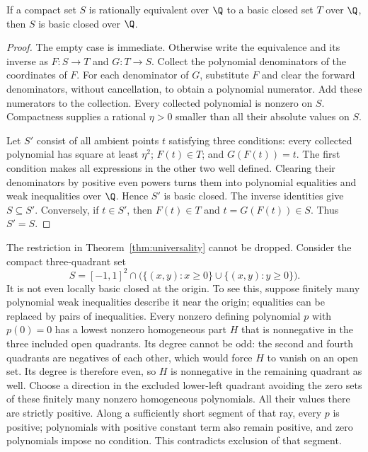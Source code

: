 \begin{proposition}
\label{prop:basic-invariance}
If a compact set $S$ is rationally equivalent over $\Q$ to a basic closed
set $T$ over $\Q$, then $S$ is basic closed over $\Q$.
\end{proposition}
\begin{proof}
The empty case is immediate. Otherwise write the equivalence and its
inverse as $F:S\to T$ and $G:T\to S$. Collect the polynomial denominators
of the coordinates of $F$. For each denominator of $G$, substitute $F$
and clear the forward denominators, without cancellation, to obtain a
polynomial numerator. Add these numerators to the collection. Every
collected polynomial is nonzero on $S$. Compactness supplies a rational
$\eta>0$ smaller than all their absolute values on $S$.

Let $S'$ consist of all ambient points $t$ satisfying three conditions:
every collected polynomial has square at least $\eta^2$;
$F(t)\in T$; and $G(F(t))=t$. The first condition makes all expressions
in the other two well defined. Clearing their denominators by positive
even powers turns them into polynomial equalities and weak inequalities
over $\Q$. Hence $S'$ is basic closed. The inverse identities give
$S\subseteq S'$. Conversely, if $t\in S'$, then $F(t)\in T$ and
$t=G(F(t))\in S$. Thus $S'=S$.
\end{proof}

The restriction in Theorem~\ref{thm:universality} cannot be dropped.
Consider the compact three-quadrant set
\begin{equation}
\label{eq:three-quadrants}
 S=[-1,1]^2\cap\bigl(\{(x,y):x\ge0\}\cup\{(x,y):y\ge0\}\bigr).
\end{equation}
It is not even locally basic closed at the origin. To see this, suppose
finitely many polynomial weak inequalities describe it near the origin;
equalities can be replaced by pairs of inequalities. Every nonzero
defining polynomial $p$ with $p(0)=0$ has a lowest nonzero homogeneous
part $H$ that is nonnegative in the three included open quadrants.
Its degree cannot be odd: the second and fourth quadrants are negatives
of each other, which would force $H$ to vanish on an open set.
Its degree is therefore even, so $H$ is nonnegative in the
remaining quadrant as well. Choose a direction in the excluded lower-left
quadrant avoiding the zero sets of these finitely many nonzero homogeneous
polynomials. All their values there are strictly positive. Along a
sufficiently short segment of that ray, every $p$ is positive; polynomials
with positive constant term also remain positive, and zero polynomials
impose no condition. This contradicts exclusion of that segment.

